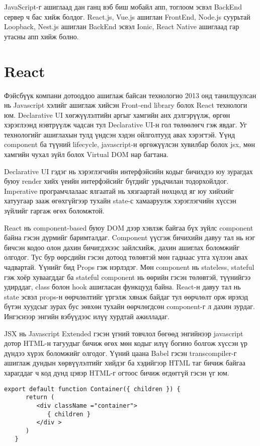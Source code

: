 JavaScript-г ашиглаад дан ганц вэб биш мобайл апп, тоглоом эсвэл BackEnd сервер ч бас хийж болдог. React.js, Vue.js ашиглан FrontEnd, Node.js суурьтай Loopback, Nest.js ашиглан BackEnd эсвэл Ionic, React Native ашиглаад гар утасны апп хийж болно.

\section{React}
Фэйсбүүк компани дотооддоо ашиглаж байсан технологио 2013 онд танилцуулсан нь Javascript хэлийг ашиглаж хийсэн Front-end library болох React технологи юм. Declarative UI хөгжүүлэлтийн аргыг хамгийн анх дэлгэрүүлж, өргөн хэрэглээнд нэвтрүүлж чадсан тул Declarative UI-н гол төлөөлөгч гэж явдаг. Уг технологийг ашиглахын тулд үндсэн хэдэн ойлголтууд авах хэрэгтэй. Үүнд component ба түүний lifecycle, javascript-н өргөжүүлсэн хувилбар болох jsx, мөн хамгийн чухал зүйл болох Virtual DOM нар багтана.

Declarative UI гэдэг нь хэрэглэгчийн интерфэйсийн кодыг бичихдээ юу зурагдах буюу render хийх үеийн интерфэйсийг бүгдийг урьдчилан тодорхойлдог. Imperative програмчлалаас
ялгаатай нь хязгаартай нөхцөлд яг юу хийхийг хатуугаар зааж өгөхгүйгээр тухайн state-с хамааруулж хэрэглэгчийн хүссэн зүйлийг гаргаж өгөх боломжтой.

React нь component-based буюу DOM дээр хэвлэж байгаа бүх зүйлс component байна гэсэн дүрмийг баримталдаг. Component үүсгэж бичихийн давуу тал нь нэг бичсэн кодоо олон дахин
бичигдэхээс зайлсхийж, дахин ашиглах боломжийг олгодог. Тус бур өөрсдийн гэсэн дотоод төлөвтэй мөн гаднаас утга хүлээн авах чадвартай. Үүнийг бид Props гэж нэрлэдэг. Мөн
component нь stateless, stateful гэж хоёр хуваагддаг ба stateful component нь өөрийн гэсэн төлөвтэй, түүнийгээ удирддаг, class болон hook ашигласан функцууд байна. React-н давуу тал нь state эсвэл props-н өөрчлөлтийг үргэлж хянаж байдаг тул өөрчлөлт орж ирэхэд бүтэн хуудсыг зурах бус зөвхөн тухайн өөрчлөгдсөн component-г л дахин зурдаг. Ингэснээр энгийн вэбүүдээс илүү хурдтай ажилладаг.

JSX нь Javascript Extended гэсэн үгний товчлол бөгөөд энгийнээр javascript дотор HTML-н тагуудыг бичиж өгөх мөн кодыг илүү богино болгож хүссэн үр дүндээ хүрэх боломжийг
олгодог. Үүний цаана Babel гэсэн transcompiler-г ашиглаж дундын хөрвүүлэлтийг хийдэг ба хэдийгээр HTML таг бичиж байгаа харагддаг ч код дунд цэвэр HTML-г огтоос бичиж
өгдөггүй гэсэн үг юм.

\begin{lstlisting}[caption=JSX ашиглаж ”container” класстай html элемент буцаах компонент, frame=single]
   export default function Container({ children }) {
      return (
         <div className ="container">
            { children }
         </div >
      )
   }
\end{lstlisting}

